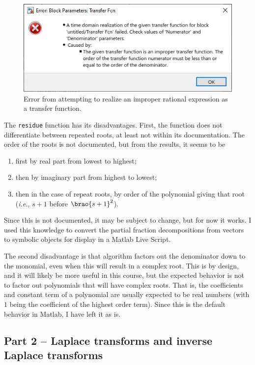 \documentclass[12pt]{article}
\DeclarePairedDelimiter\brao()%
\begin{document}
\begin{figure}[h!]
    \centering
    \includegraphics[width=0.8\linewidth]{improper_transfer_function.png}
    \caption{Error from attempting to realize an improper rational expression as a transfer function.}
    \label{fig:error:improper transfer function}
\end{figure}

The \texttt{residue} function has its disadvantages.
First, the function does not differentiate between repeated roots, at least not within its documentation.
The order of the roots is not documented, but from the results, it seems to be
\begin{enumerate}
    \item first by real part from lowest to highest;
    \item then by imaginary part from highest to lowest;
    \item then in the case of repeat roots, by order of the polynomial giving that root (\textit{i.e.}, $s+1$ before $\brao{s+1}^2$).
\end{enumerate}

Since this is not documented, it may be subject to change, but for now it works.
I used this knowledge to convert the partial fraction decompositions from vectors to symbolic objects for display in a Matlab Live Script.

The second disadvantage is that algorithm factors out the denominator down to the monomial, even when this will result in a complex root.
This is by design, and it will likely be more useful in this course,
but the expected behavior is not to factor out polynomials that will have complex roots.
That is, the coefficients and constant term of a polynomial are usually expected to be real numbers (with $1$ being the coefficient of the highest order term).
Since this is the default behavior in Matlab, I have left it as is.

\subsection{Part 2 -- Laplace transforms and inverse Laplace transforms}
\end{document}
